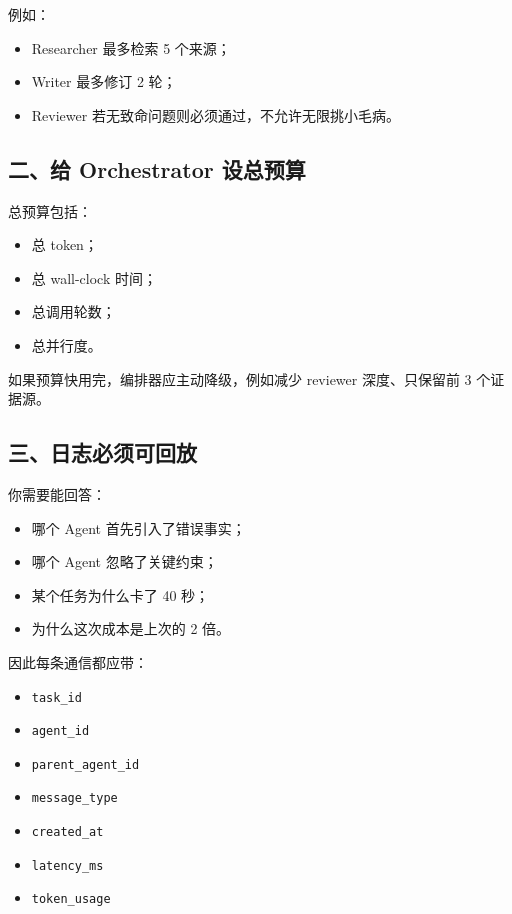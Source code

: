 例如：


\begin{itemize}[leftmargin=2em]
\item Researcher 最多检索 5 个来源；
\item Writer 最多修订 2 轮；
\item Reviewer 若无致命问题则必须通过，不允许无限挑小毛病。
\end{itemize}

\subsection{二、给 Orchestrator 设总预算}

总预算包括：


\begin{itemize}[leftmargin=2em]
\item 总 token；
\item 总 wall-clock 时间；
\item 总调用轮数；
\item 总并行度。
\end{itemize}

如果预算快用完，编排器应主动降级，例如减少 reviewer 深度、只保留前 3 个证据源。


\subsection{三、日志必须可回放}

你需要能回答：


\begin{itemize}[leftmargin=2em]
\item 哪个 Agent 首先引入了错误事实；
\item 哪个 Agent 忽略了关键约束；
\item 某个任务为什么卡了 40 秒；
\item 为什么这次成本是上次的 2 倍。
\end{itemize}

因此每条通信都应带：


\begin{itemize}[leftmargin=2em]
\item \texttt{task\_id}
\item \texttt{agent\_id}
\item \texttt{parent\_agent\_id}
\item \texttt{message\_type}
\item \texttt{created\_at}
\item \texttt{latency\_ms}
\item \texttt{token\_usage}
\end{itemize}

